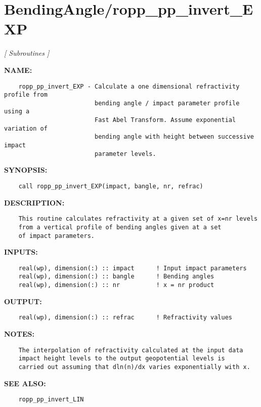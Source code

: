 \section{BendingAngle/ropp\_pp\_invert\_EXP}
\textsl{[ Subroutines ]}

\label{ch:robo2}
\label{ch:BendingAngle_ropp_pp_invert_EXP}
\textbf{NAME:}\hspace{0.08in}\begin{Verbatim}
    ropp_pp_invert_EXP - Calculate a one dimensional refractivity profile from
                         bending angle / impact parameter profile using a 
                         Fast Abel Transform. Assume exponential variation of 
                         bending angle with height between successive impact 
                         parameter levels.
\end{Verbatim}
\textbf{SYNOPSIS:}\hspace{0.08in}\begin{Verbatim}
    call ropp_pp_invert_EXP(impact, bangle, nr, refrac)
\end{Verbatim}
\textbf{DESCRIPTION:}\hspace{0.08in}\begin{Verbatim}
    This routine calculates refractivity at a given set of x=nr levels
    from a vertical profile of bending angles given at a set 
    of impact parameters.
\end{Verbatim}
\textbf{INPUTS:}\hspace{0.08in}\begin{Verbatim}
    real(wp), dimension(:) :: impact      ! Input impact parameters 
    real(wp), dimension(:) :: bangle      ! Bending angles
    real(wp), dimension(:) :: nr          ! x = nr product
\end{Verbatim}
\textbf{OUTPUT:}\hspace{0.08in}\begin{Verbatim}
    real(wp), dimension(:) :: refrac      ! Refractivity values
\end{Verbatim}
\textbf{NOTES:}\hspace{0.08in}\begin{Verbatim}
    The interpolation of refractivity calculated at the input data
    impact height levels to the output geopotential levels is
    carried out assuming that dln(n)/dx varies exponentially with x.
\end{Verbatim}
\textbf{SEE ALSO:}\hspace{0.08in}\begin{Verbatim}
    ropp_pp_invert_LIN
\end{Verbatim}
